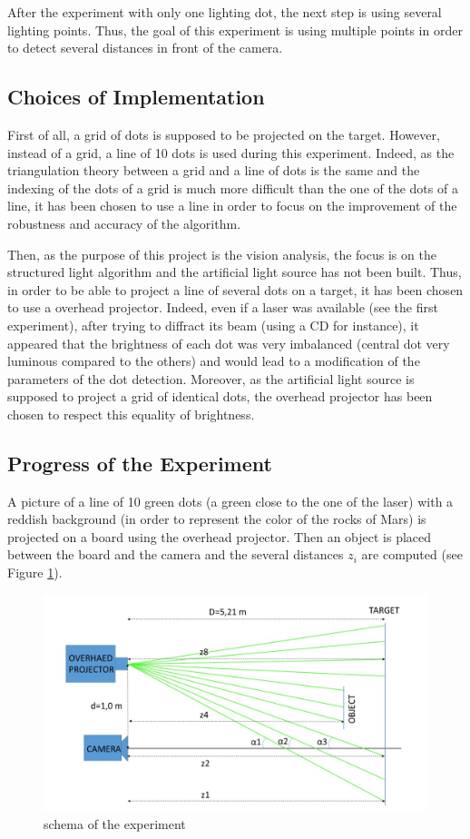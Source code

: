 After the experiment with only one lighting dot, the next step is using several lighting points. Thus, the goal of this experiment is using multiple points in order to detect several distances in front of the camera.

\subsection{Choices of Implementation}
First of all, a grid of dots is supposed to be projected on the target. However, instead of a grid, a line of 10 dots is used during this experiment. Indeed, as the triangulation theory between a grid and a line of dots is the same and the indexing of the dots of a grid is much more difficult than the one of the dots of a line, it has been chosen to use a line in order to focus on the improvement of the robustness and accuracy of the algorithm. 

Then, as the purpose of this project is the vision analysis, the focus is on the structured light algorithm and the artificial light source has not been built. Thus, in order to be able to project a line of several dots on a target, it has been chosen to use a overhead projector. Indeed, even if a laser was available (see the first experiment), after trying to diffract its beam (using a CD for instance), it appeared that the brightness of each dot was very imbalanced (central dot very luminous compared to the others) and would lead to a modification of the parameters of the dot detection. Moreover, as the artificial light source is supposed to project a grid of identical dots, the overhead projector has been chosen to respect this equality of brightness.


\subsection{Progress of the Experiment}
A picture of a line of 10 green dots (a green close to the one of the laser) with a reddish background (in order to represent the color of the rocks of Mars) is projected on a board using the overhead projector. Then an object is placed between the board and the camera and the several distances $z_i$ are computed (see Figure \ref{fig:expGridSchema}).


\begin{figure}[H]
  \centerline{\includegraphics[scale=0.4]{fig/expGridSchema.jpg}}
  \caption{schema of the experiment}
  \label{fig:expGridSchema}
\end{figure}


